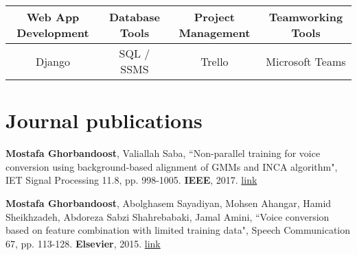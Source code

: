\documentclass[letterpaper,11pt]{article}
\begin{document}
\begin{table}[h!]
  \begin{center}
    \label{tab:table1}
    \begin{tabular}{c|c|c|c}
      Web App Development \hspace{5pt} & \hspace{5pt} Database Tools \hspace{5pt} & \hspace{5pt}Project Management \hspace{5pt} & \hspace{5pt} Teamworking Tools \hspace{5pt} \\
      \hline
      Django & SQL / SSMS &  Trello  & Microsoft Teams \\
    \end{tabular}
  \end{center}
\end{table}

\vspace{-20pt}

\section{Journal publications}
\begin{enumerate}[noitemsep, leftmargin=*,label={[\arabic*]}]
\item{\textbf{Mostafa Ghorbandoost}, Valiallah Saba, ``Non-parallel training for voice conversion using background-based alignment of GMMs and INCA algorithm", IET Signal Processing 11.8, pp. 998-1005. \textbf{IEEE}, 2017. \href{https://ieeexplore.ieee.org/document/8056552}{link}}
\vspace{5pt}
\item{\textbf{Mostafa Ghorbandoost}, Abolghasem Sayadiyan, Mohsen Ahangar, Hamid Sheikhzadeh, Abdoreza Sabzi Shahrebabaki, Jamal Amini, ``Voice conversion based on feature combination with limited training data", Speech Communication 67, pp. 113-128. \textbf{Elsevier}, 2015. \href{https://www.sciencedirect.com/science/article/abs/pii/S0167639314000892}{link}}
\end{enumerate}
\end{document}
